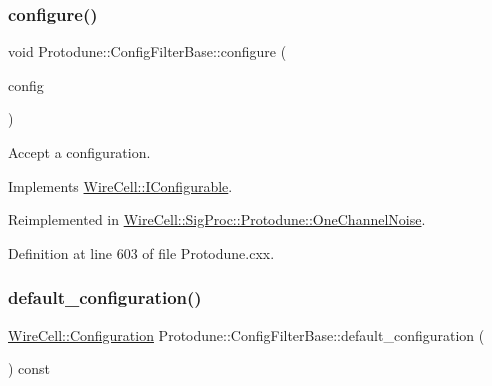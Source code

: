 \subsubsection{\texorpdfstring{configure()}{configure()}}
{\footnotesize\ttfamily void Protodune\+::\+Config\+Filter\+Base\+::configure (\begin{DoxyParamCaption}\item[{const \hyperlink{namespace_wire_cell_a9f705541fc1d46c608b3d32c182333ee}{Wire\+Cell\+::\+Configuration} \&}]{config }\end{DoxyParamCaption})\hspace{0.3cm}{\ttfamily [virtual]}}



Accept a configuration. 



Implements \hyperlink{class_wire_cell_1_1_i_configurable_a57ff687923a724093df3de59c6ff237d}{Wire\+Cell\+::\+I\+Configurable}.



Reimplemented in \hyperlink{class_wire_cell_1_1_sig_proc_1_1_protodune_1_1_one_channel_noise_acf32ea2e00ad1f3e39e987aa30ca60c3}{Wire\+Cell\+::\+Sig\+Proc\+::\+Protodune\+::\+One\+Channel\+Noise}.



Definition at line 603 of file Protodune.\+cxx.

\mbox{\label{class_wire_cell_1_1_sig_proc_1_1_protodune_1_1_config_filter_base_a68b71c244f3a6ade0320a43f1699f1c9}} 
\subsubsection{\texorpdfstring{default\+\_\+configuration()}{default\_configuration()}}
{\footnotesize\ttfamily \hyperlink{namespace_wire_cell_a9f705541fc1d46c608b3d32c182333ee}{Wire\+Cell\+::\+Configuration} Protodune\+::\+Config\+Filter\+Base\+::default\+\_\+configuration (\begin{DoxyParamCaption}{ }\end{DoxyParamCaption}) const\hspace{0.3cm}{\ttfamily [virtual]}}



